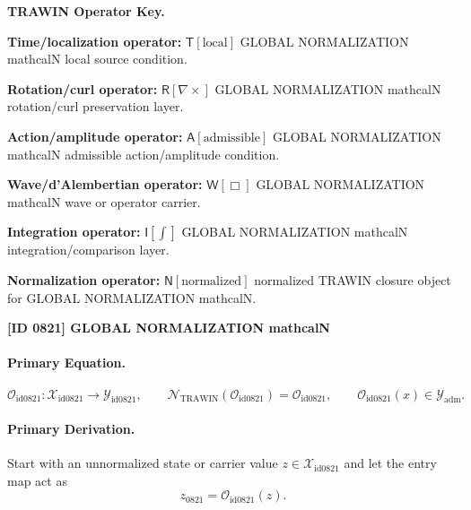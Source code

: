\par\vspace{0.45\baselineskip}
\noindent\begin{minipage}[t]{\linewidth}
\begingroup
\small
\raggedright
\textbf{TRAWIN Operator Key.}\par
\noindent\textbf{Time/localization operator:} $\mathsf{T}\!\left[\mathrm{local}\right]$ GLOBAL NORMALIZATION mathcalN local source condition.\par
\noindent\textbf{Rotation/curl operator:} $\mathsf{R}\!\left[\nabla\times\right]$ GLOBAL NORMALIZATION mathcalN rotation/curl preservation layer.\par
\noindent\textbf{Action/amplitude operator:} $\mathsf{A}\!\left[\mathrm{admissible}\right]$ GLOBAL NORMALIZATION mathcalN admissible action/amplitude condition.\par
\noindent\textbf{Wave/d'Alembertian operator:} $\mathsf{W}\!\left[\Box\right]$ GLOBAL NORMALIZATION mathcalN wave or operator carrier.\par
\noindent\textbf{Integration operator:} $\mathsf{I}\!\left[\int\right]$ GLOBAL NORMALIZATION mathcalN integration/comparison layer.\par
\noindent\textbf{Normalization operator:} $\mathsf{N}\!\left[\mathrm{normalized}\right]$ normalized TRAWIN closure object for GLOBAL NORMALIZATION mathcalN.\par
\endgroup
\end{minipage}

\clearpage
\noindent\textbf{[ID 0821] GLOBAL NORMALIZATION mathcalN}\par
\vspace{0.35em}
\paragraph{Primary Equation.}
\[
\mathcal{O}_{\mathrm{id0821}}:\mathcal{X}_{\mathrm{id0821}}\longrightarrow \mathcal{Y}_{\mathrm{id0821}},\qquad
\mathcal{N}_{\mathrm{TRAWIN}}(\mathcal{O}_{\mathrm{id0821}})=\mathcal{O}_{\mathrm{id0821}},\qquad
\mathcal{O}_{\mathrm{id0821}}(x)\in\mathcal{Y}_{\mathrm{adm}}.
\]

\paragraph{Primary Derivation.} Start with an unnormalized state or carrier value $z\in \mathcal{X}_{\mathrm{id0821}}$ and let the entry map act as\[
z_{0821}=\mathcal{O}_{\mathrm{id0821}}(z).
\]

